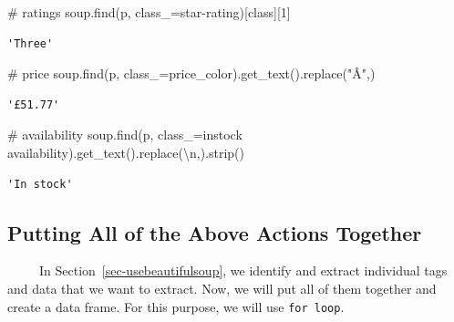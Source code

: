 \documentclass[
  letterpaper,
  DIV=11,
  numbers=noendperiod]{scrreprt}
\newenvironment{Shaded}{\begin{snugshade}}{\end{snugshade}}
\newcommand{\CharTok}[1]{\textcolor[rgb]{0.13,0.47,0.30}{#1}}
\newcommand{\CommentTok}[1]{\textcolor[rgb]{0.37,0.37,0.37}{#1}}
\newcommand{\DecValTok}[1]{\textcolor[rgb]{0.68,0.00,0.00}{#1}}
\newcommand{\NormalTok}[1]{\textcolor[rgb]{0.00,0.23,0.31}{#1}}
\newcommand{\OperatorTok}[1]{\textcolor[rgb]{0.37,0.37,0.37}{#1}}
\newcommand{\StringTok}[1]{\textcolor[rgb]{0.13,0.47,0.30}{#1}}
\begin{document}
\begin{Shaded}
\begin{Highlighting}[]
\CommentTok{\# ratings }
\NormalTok{soup.find(}\StringTok{\textquotesingle{}p\textquotesingle{}}\NormalTok{, class\_}\OperatorTok{=}\StringTok{\textquotesingle{}star{-}rating\textquotesingle{}}\NormalTok{)[}\StringTok{\textquotesingle{}class\textquotesingle{}}\NormalTok{][}\DecValTok{1}\NormalTok{]}
\end{Highlighting}
\end{Shaded}

\begin{verbatim}
'Three'
\end{verbatim}

\begin{Shaded}
\begin{Highlighting}[]
\CommentTok{\# price }
\NormalTok{soup.find(}\StringTok{\textquotesingle{}p\textquotesingle{}}\NormalTok{, class\_}\OperatorTok{=}\StringTok{\textquotesingle{}price\_color\textquotesingle{}}\NormalTok{).get\_text().replace(}\StringTok{"Â"}\NormalTok{,}\StringTok{\textquotesingle{}\textquotesingle{}}\NormalTok{)}
\end{Highlighting}
\end{Shaded}

\begin{verbatim}
'£51.77'
\end{verbatim}

\begin{Shaded}
\begin{Highlighting}[]
\CommentTok{\# availability }
\NormalTok{soup.find(}\StringTok{\textquotesingle{}p\textquotesingle{}}\NormalTok{, class\_}\OperatorTok{=}\StringTok{\textquotesingle{}instock availability\textquotesingle{}}\NormalTok{).get\_text().replace(}\StringTok{\textquotesingle{}}\CharTok{\textbackslash{}n}\StringTok{\textquotesingle{}}\NormalTok{,}\StringTok{\textquotesingle{}\textquotesingle{}}\NormalTok{).strip()}
\end{Highlighting}
\end{Shaded}

\begin{verbatim}
'In stock'
\end{verbatim}

\subsection{Putting All of the Above Actions
Together}\label{sec-onepage}

~~~~~In Section~\ref{sec-usebeautifulsoup}, we identify and extract
individual tags and data that we want to extract. Now, we will put all
of them together and create a data frame. For this purpose, we will use
\texttt{for\ loop}.
\end{document}
